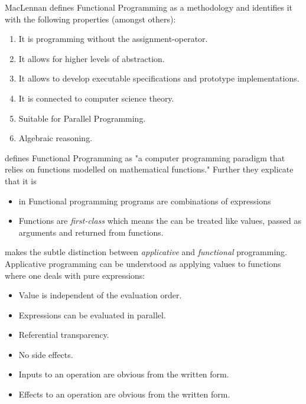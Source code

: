 MacLennan \cite{maclennan_functional_1990} defines Functional Programming as a methodology and identifies it with the following properties (amongst others):

\begin{enumerate}
	\item It is programming without the assignment-operator.
	\item It allows for higher levels of abstraction.
	\item It allows to develop executable specifications and prototype implementations.
	\item It is connected to computer science theory.
	\item Suitable for Parallel Programming.
	\item Algebraic reasoning.
\end{enumerate}

\cite{allen_haskell_2016} defines Functional Programming as "a computer programming paradigm that relies on functions modelled on mathematical functions." Further they explicate that it is 
\begin{itemize}
	\item in Functional programming programs are combinations of expressions
	\item Functions are \textit{first-class} which means the can be treated like values, passed as arguments and returned from functions.
\end{itemize}

\cite{maclennan_functional_1990} makes the subtle distinction between \textit{applicative} and \textit{functional} programming. Applicative programming can be understood as applying values to functions where one deals with pure expressions:

\begin{itemize}
	\item Value is independent of the evaluation order.
	\item Expressions can be evaluated in parallel.
	\item Referential transparency.
	\item No side effects.
	\item Inputs to an operation are obvious from the written form.
	\item Effects to an operation are obvious from the written form.
\end{itemize}

